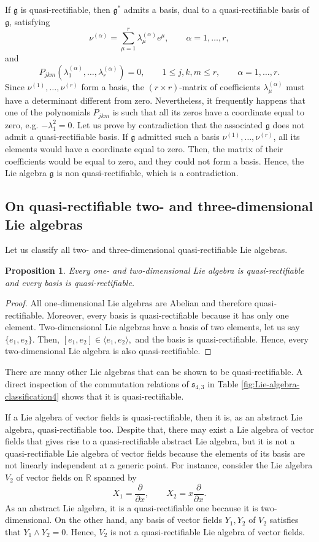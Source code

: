 \documentclass[12pt]{article}
\theoremstyle{plain}
\newtheorem{proposition}[theorem]{Proposition}
\theoremstyle{definition}
\numberwithin{equation}{section}
\begin{document}
If $\mathfrak{g}$ is quasi-rectifiable, then $\mathfrak{g}^*$ admits a basis, dual to a quasi-rectifiable basis of $\mathfrak{g}$, satisfying
$$
\nu^{(\alpha)}=\sum_{\mu=1}^r\lambda^{(\alpha)}_{\mu} e^\mu,\qquad \alpha=1,\ldots,r,
$$
and
$$
P_{jkm}(\lambda^{(\alpha)}_{1},\ldots,\lambda^{(\alpha)}_{r})=0,\qquad 1\leq j,k,m\leq r,\qquad \alpha=1,\ldots,r.
$$
Since $\nu^{(1)},\ldots,\nu^{(r)}$ form a basis, the $(r\times r)$-matrix of coefficients $\lambda^{(\alpha)}_\mu$ must have a determinant different from zero. Nevertheless, it frequently happens that one of the polynomials $P_{jkm}$ is such that all its zeros have a coordinate equal to zero, e.g. $-\lambda_1^2=0$. Let us prove by contradiction that the associated $\mathfrak{g}$ does not admit a quasi-rectifiable basis. If $\mathfrak{g}$ admitted such a basis $\nu^{(1)},\ldots,\nu^{(r)}$, all its elements would have a coordinate equal to zero. Then, the matrix of their coefficients would be equal to zero, and they could not form a basis. Hence, the Lie algebra $\mathfrak{g}$ is non quasi-rectifiable, which is a contradiction.

\subsection{On quasi-rectifiable two- and three-dimensional Lie algebras}
Let us classify all two- and three-dimensional quasi-rectifiable Lie algebras.

\begin{proposition} Every one- and two-dimensional Lie algebra is quasi-rectifiable and every basis is quasi-rectifiable.
\end{proposition}
\begin{proof}
All one-dimensional Lie algebras are Abelian and therefore quasi-rectifiable. Moreover, every basis is quasi-rectifiable because it has only one element. Two-dimensional Lie algebras have a basis of two elements, let us say $\{e_1,e_2\}$. Then,
$
[e_1,e_2]\in \langle e_1,e_2\rangle,
$
and the basis is quasi-rectifiable. Hence, every two-dimensional Lie algebra is also quasi-rectifiable.
\end{proof}

There are many other Lie algebras that can be shown to be quasi-rectifiable. A direct inspection of the commutation relations of $\mathfrak{s}_{4,3}$ in Table \ref{fig:Lie-algebra-classification4} shows that it is quasi-rectifiable.

If a Lie algebra of vector fields is quasi-rectifiable, then it is, as an abstract Lie algebra, quasi-rectifiable too. Despite that, there may exist a Lie algebra of vector fields that gives rise to a quasi-rectifiable abstract Lie algebra, but it is not a quasi-rectifiable Lie algebra of vector fields because the elements of its basis are not linearly independent at a generic point. For instance, consider the Lie algebra $V_2$ of vector fields on $\mathbb{R}$ spanned by 
$$
X_1=\frac{\partial}{\partial x},\qquad X_2=x\frac{\partial}{\partial x}.
$$
As an abstract Lie algebra, it is a quasi-rectifiable one because it is two-dimensional. On the other hand, any basis of vector fields $Y_1,Y_2$ of $V_2$ satisfies that $Y_1\wedge Y_2=0$. Hence, $V_2$ is not a quasi-rectifiable Lie algebra of vector fields.
\end{document}
